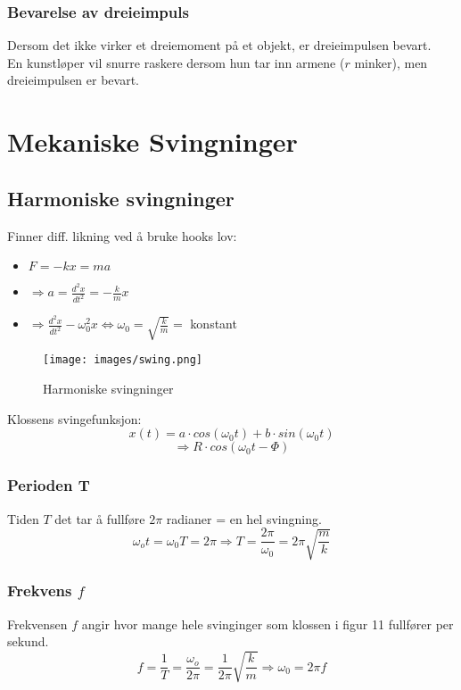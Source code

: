 \documentclass[12pt]{article}
\begin{document}
\subsubsection{Bevarelse av dreieimpuls}
Dersom det ikke virker et dreiemoment på et objekt, er dreieimpulsen bevart.\\
En kunstløper vil snurre raskere dersom hun tar inn armene ($r$ minker), men dreieimpulsen er bevart.

\section{Mekaniske Svingninger}
\subsection{Harmoniske svingninger}
Finner diff. likning ved å bruke hooks lov:
\begin{itemize}
    \item[] $F = -kx = ma$
    \item[] $\Rightarrow a = \frac{d^2x}{dt^2} = -\frac{k}{m}x$
    \item[] $\Rightarrow \frac{d^2x}{dt^2}-\omega_0^2x \Leftrightarrow \omega_0 = \sqrt{\frac{k}{m}} = $ konstant
\end{itemize}
\begin{figure} [H]
    \centering
    \texttt{[image: images/swing.png]}
    \caption{Harmoniske svingninger}
\end{figure}
Klossens svingefunksjon:
$$x(t) = a\cdot cos(\omega_0t) + b\cdot sin(\omega_0t)$$
$$\Rightarrow R \cdot cos(\omega_0t - \Phi)$$
\bigskip
\subsubsection{Perioden T}
Tiden $T$ det tar å  fullføre $2\pi$ radianer = en hel svingning.
$$\omega_ot = \omega_0T = 2\pi \Rightarrow T = \frac{2\pi}{\omega_0} = 2\pi \sqrt{\frac{m}{k}}$$


\subsubsection{Frekvens $f$}
Frekvensen $f$ angir hvor mange hele svinginger som klossen i figur 11 fullfører per sekund.
$$f = \frac{1}{T} = \frac{\omega_o}{2\pi} = \frac{1}{2\pi}\sqrt{\frac{k}{m}} \Rightarrow \omega_0 = 2\pi f$$
\end{document}
